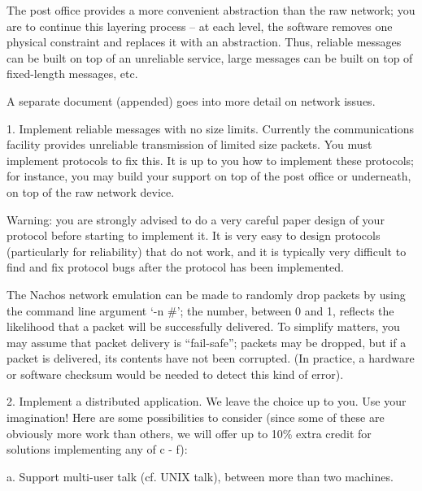 The post office provides a more convenient abstraction than the raw network;
you are to continue this layering process -- at each level, the
software removes one physical constraint and replaces it with an abstraction.
Thus, reliable messages can be built on top of an unreliable service,
large messages can be built on top of fixed-length messages, etc.

A separate document (appended) goes into more detail on network issues.

\begin{description}

\item{1.} Implement reliable messages with no size limits.
Currently the communications facility provides unreliable transmission
of limited size packets.  You must implement protocols to fix this.
It is up to you how to implement these protocols; for instance, you may
build your support on top of the post office or underneath, on top of
the raw network device.

Warning: you are strongly advised to do a very careful paper design
of your protocol before starting to implement it.  It is very
easy to design protocols (particularly for reliability) that do not
work, and it is typically very difficult to find and fix protocol bugs
after the protocol has been implemented.

The Nachos network emulation can be made to randomly drop packets by
using the command line argument `-n \#'; the number, between 0 and 1,
reflects the likelihood that a packet will be successfully delivered.
To simplify matters, you may assume that packet delivery is ``fail-safe'';
packets may be dropped, but if a packet is delivered, its contents have
not been corrupted.  (In practice, a hardware or software checksum would
be needed to detect this kind of error).


\item{2.} Implement a distributed application.
We leave the choice up to you.  Use your imagination!
Here are some possibilities to consider (since some of these are
obviously more work than others, we will offer up to 10\% extra credit
for solutions implementing any of c - f):

\begin{description}

\item{a.} Support multi-user talk (cf. UNIX talk), between more than
two machines.


\end{description}
\end{description}
